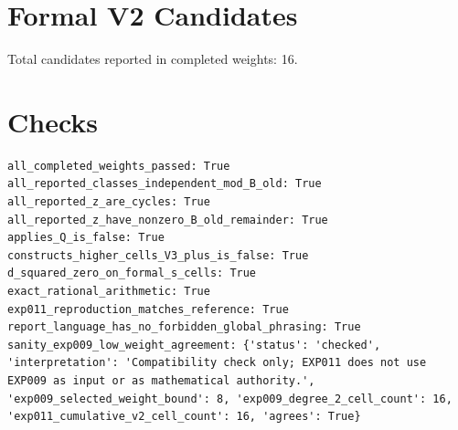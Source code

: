 \documentclass{article}
\begin{document}
\section*{Formal V2 Candidates}
Total candidates reported in completed weights: 16.
\section*{Checks}
\begin{verbatim}
all_completed_weights_passed: True
all_reported_classes_independent_mod_B_old: True
all_reported_z_are_cycles: True
all_reported_z_have_nonzero_B_old_remainder: True
applies_Q_is_false: True
constructs_higher_cells_V3_plus_is_false: True
d_squared_zero_on_formal_s_cells: True
exact_rational_arithmetic: True
exp011_reproduction_matches_reference: True
report_language_has_no_forbidden_global_phrasing: True
sanity_exp009_low_weight_agreement: {'status': 'checked', 'interpretation': 'Compatibility check only; EXP011 does not use EXP009 as input or as mathematical authority.', 'exp009_selected_weight_bound': 8, 'exp009_degree_2_cell_count': 16, 'exp011_cumulative_v2_cell_count': 16, 'agrees': True}
\end{verbatim}
\end{document}
